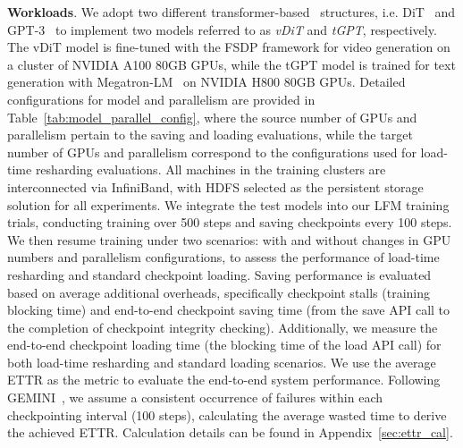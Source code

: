 \noindent \textbf{Workloads}.
We adopt two different transformer-based~\cite{attention} structures, i.e. DiT~\cite{dit} and GPT-3~\cite{gpt3} to implement two models referred to as \textit{vDiT} and \textit{tGPT}, respectively.
The vDiT model is fine-tuned with the FSDP framework for video generation on a cluster of NVIDIA A100 80GB GPUs, while the tGPT model is trained for text generation with Megatron-LM~\cite{megatron} on NVIDIA H800 80GB GPUs.
Detailed configurations for model and parallelism are provided in Table~\ref{tab:model_parallel_config}, where the source number of GPUs and parallelism pertain to the saving and loading evaluations, while the target number of GPUs and parallelism correspond to the configurations used for load-time resharding evaluations. All machines in the training clusters are interconnected via InfiniBand,
with HDFS selected as the persistent storage solution for all experiments.
We integrate the test models into our LFM training trials, conducting training over 500 steps and saving checkpoints every 100 steps. We then resume training under two scenarios: with and without changes in GPU numbers and parallelism configurations, to assess the performance of load-time resharding and standard checkpoint loading.
Saving performance is evaluated based on average additional overheads, specifically checkpoint stalls (training blocking time) and end-to-end checkpoint saving time (from the save API call to the completion of checkpoint integrity checking).
Additionally, we measure the end-to-end checkpoint loading time (the blocking time of the load API call) for both load-time resharding and standard loading scenarios.
We use the average ETTR as the metric to evaluate the end-to-end system performance.
Following GEMINI~\cite{gemini-sys}, we assume a consistent occurrence of failures within each checkpointing interval (100 steps), calculating the average wasted time to derive the achieved ETTR.
Calculation details can be found in Appendix~\ref{sec:ettr_cal}.

